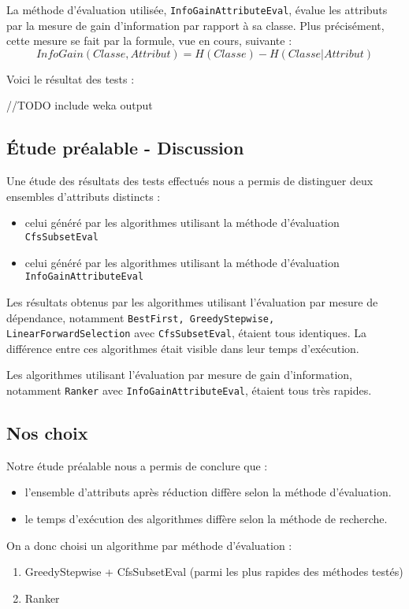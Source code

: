 La méthode d'évaluation utilisée, \texttt{InfoGainAttributeEval}, évalue les attributs par la mesure de gain d'information par rapport à sa classe. Plus précisément, cette mesure se fait par la formule, vue en cours, suivante : 
\begin{equation*}
InfoGain(Classe,Attribut) = H(Classe) - H(Classe|Attribut)
\end{equation*}

Voici le résultat des tests :

//TODO include weka output

\subsection{Étude préalable - Discussion}
Une étude des résultats des tests effectués nous a permis de distinguer deux ensembles d'attributs distincts : 
\begin{itemize}
\item celui généré par les algorithmes utilisant la méthode d'évaluation \texttt{CfsSubsetEval}
\item celui généré par les algorithmes utilisant la méthode d'évaluation \texttt{InfoGainAttributeEval}
\end{itemize}

Les résultats obtenus par les algorithmes utilisant l'évaluation par mesure de dépendance, notamment \texttt{BestFirst, GreedyStepwise, LinearForwardSelection} avec \texttt{CfsSubsetEval}, étaient tous identiques. La différence entre ces algorithmes était visible dans leur temps d'exécution.   

Les algorithmes utilisant l'évaluation par mesure de gain d'information, notamment \texttt{Ranker} avec \texttt{InfoGainAttributeEval}, étaient tous très rapides. 
\subsection{Nos choix}

Notre étude préalable nous a permis de conclure que :
\begin{itemize}
	\item l'ensemble d'attributs après réduction diffère selon la méthode d'évaluation.
	\item le temps d'exécution des algorithmes diffère selon la méthode de recherche. 
\end{itemize}

On a donc choisi un algorithme par méthode d'évaluation : 
\begin{enumerate}
\item GreedyStepwise + CfsSubsetEval (parmi les plus rapides des méthodes testés)
\item Ranker 
\end{enumerate}
